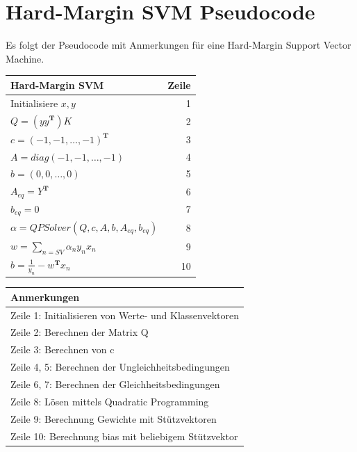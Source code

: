 \documentclass[a4paper,11pt,twoside]{scrreprt}
\begin{document}
\section{Hard-Margin SVM Pseudocode}\label{sec:hsvmpseudo}
Es folgt der Pseudocode mit Anmerkungen für eine Hard-Margin Support Vector Machine.
\begin{table}[H]\label{tab:hmpc}
\begin{tabular}{|l r|}
    \hline
    \textbf{Hard-Margin SVM} & \textbf{Zeile} \\
    \hline
    Initialisiere $x, y$ & 1\\
    $Q = (yy^{\mathbf{T}})K$ & 2\\
    $c = \left( -1, -1, \ldots, -1 \right)^{\mathbf{T}}$ & 3 \\
    $A = diag\left( -1, -1, \ldots, -1 \right)$ & 4 \\
    $b = \left( 0, 0, \ldots, 0 \right)$ & 5\\
    $A_{eq} = Y^{\mathbf{T}}$ & 6\\
    $b_{eq} = 0$ & 7\\
    $\alpha = QPSolver\left( Q, c, A, b, A_{eq}, b_{eq} \right)$ & 8\\
    $w = \sum_{n=SV} \alpha_{n} y_{n} x_{n} $  & 9\\
    $b = \frac{1}{y_{n}} - w^{\mathbf{T}}x_{n}$ & 10\\
    \hline
\end{tabular}
\begin{tabular}{|l|}
    \hline
    \textbf{Anmerkungen} \\
    \hline
    Zeile 1: Initialisieren von Werte- und Klassenvektoren\\
    Zeile 2: Berechnen der Matrix Q \\
    Zeile 3: Berechnen von c \\
    Zeile 4, 5: Berechnen der Ungleichheitsbedingungen\\
    Zeile 6, 7: Berechnen der Gleichheitsbedingungen\\
    Zeile 8: Lösen mittels Quadratic Programming \\
    Zeile 9: Berechnung Gewichte mit Stützvektoren \\
    Zeile 10: Berechnung bias mit beliebigem Stützvektor \\
    \hline
\end{tabular}
\end{table}


\nocite{*}

\clearpage
{}
{}
\printbibliography[title=Weiterführende Ressourcen]
\end{document}

